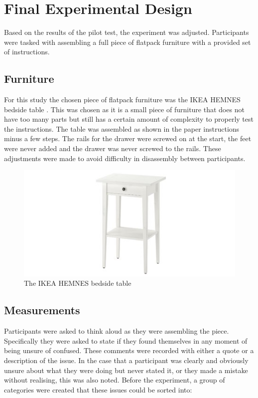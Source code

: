 \documentclass{l4proj}
\begin{document}
\section{Final Experimental Design}

Based on the results of the pilot test, the experiment was adjusted. Participants were tasked with assembling a full piece of flatpack furniture with a provided set of instructions. 

\subsection{Furniture}

For this study the chosen piece of flatpack furniture was the IKEA HEMNES bedside table \citep{noauthor_hemnes_nodate}. This was chosen as it is a small piece of furniture that does not have too many parts but still has a certain amount of complexity to properly test the instructions. The table was assembled as shown in the paper instructions minus a few steps. The rails for the drawer were screwed on at the start, the feet were never added and the drawer was never screwed to the rails. These adjustments were made to avoid difficulty in disassembly between participants.

\begin{figure}[hbt!]
    \centering
    \includegraphics[width=0.7\linewidth]{dissertation//images/bedsideTable.jpg}
    \caption{The IKEA HEMNES bedside table \citep{noauthor_hemnes_nodate}}
    \label{fig:hemnes}
\end{figure}

\subsection{Measurements}

Participants were asked to think aloud as they were assembling the piece. Specifically they were asked to state if they found themselves in any moment of being unsure of confused. These comments were recorded with either a quote or a description of the issue. In the case that a participant was clearly and obviously unsure about what they were doing but never stated it, or they made a mistake without realising, this was also noted. Before the experiment, a group of categories were created that these issues could be sorted into:
\end{document}
